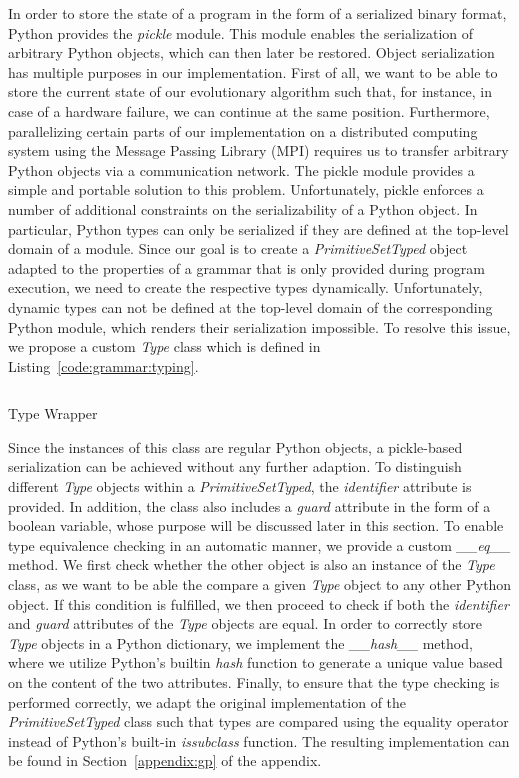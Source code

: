In order to store the state of a program in the form of a serialized binary format, Python provides the \emph{pickle} module.
This module enables the serialization of arbitrary Python objects, which can then later be restored.
Object serialization has multiple purposes in our implementation.
First of all, we want to be able to store the current state of our evolutionary algorithm such that, for instance, in case of a hardware failure, we can continue at the same position.
Furthermore, parallelizing certain parts of our implementation on a distributed computing system using the Message Passing Library (MPI) requires us to transfer arbitrary Python objects via a communication network.
The pickle module provides a simple and portable solution to this problem.
Unfortunately, pickle enforces a number of additional constraints on the serializability of a Python object.
In particular, Python types can only be serialized if they are defined at the top-level domain of a module.
Since our goal is to create a \emph{PrimitiveSetTyped} object adapted to the properties of a grammar that is only provided during program execution, we need to create the respective types dynamically.
Unfortunately, dynamic types can not be defined at the top-level domain of the corresponding Python module, which renders their serialization impossible.
To resolve this issue, we propose a custom \emph{Type} class which is defined in Listing~\ref{code:grammar:typing}.
\begin{listing}
	\inputminted{python}{evostencils/grammar/typing.py}
	\caption{Type Wrapper}
	\label{code:grammar:typing}
\end{listing}
Since the instances of this class are regular Python objects, a pickle-based serialization can be achieved without any further adaption.
To distinguish different \emph{Type} objects within a \emph{PrimitiveSetTyped}, the \emph{identifier} attribute is provided.
In addition, the class also includes a \emph{guard} attribute in the form of a boolean variable, whose purpose will be discussed later in this section. 
To enable type equivalence checking in an automatic manner, we provide a custom \emph{\_\_eq\_\_} method.
We first check whether the other object is also an instance of the \emph{Type} class, as we want to be able the compare a given \emph{Type} object to any other Python object.
If this condition is fulfilled, we then proceed to check if both the \emph{identifier} and \emph{guard} attributes of the \emph{Type} objects are equal.
In order to correctly store \emph{Type} objects in a Python dictionary, we implement the \emph{\_\_hash\_\_} method, where we utilize Python's builtin \emph{hash} function to generate a unique value based on the content of the two attributes. 
Finally, to ensure that the type checking is performed correctly, we adapt the original implementation of the \emph{PrimitiveSetTyped} class such that types are compared using the equality operator instead of Python's built-in \emph{issubclass} function.
The resulting implementation can be found in Section~\ref{appendix:gp} of the appendix.

